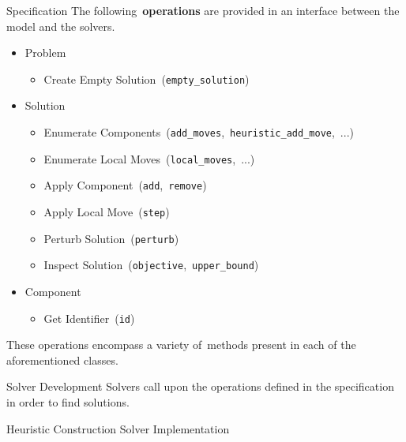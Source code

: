 \begin{frame}{Specification}
  The following~\textbf{operations} are provided in an interface between the model and the solvers.

  \begin{itemize}
    \item Problem
          \begin{itemize}
            \item Create Empty Solution~(\texttt{empty\_solution})
          \end{itemize}
    \item Solution
          \begin{itemize}
            \item Enumerate Components~(\texttt{add\_moves},~\texttt{heuristic\_add\_move},~...)
            \item Enumerate Local Moves~(\texttt{local\_moves},~...)
            \item Apply Component~(\texttt{add},~\texttt{remove})
            \item Apply Local Move~(\texttt{step})
            \item Perturb Solution~(\texttt{perturb})
            \item Inspect Solution~(\texttt{objective},~\texttt{upper\_bound})
          \end{itemize}
    \item Component
          \begin{itemize}
            \item Get Identifier~(\texttt{id})
          \end{itemize}
  \end{itemize}

  These operations encompass a variety of~\alert{methods} present in each of the aforementioned classes.
\end{frame}

\begin{frame}[fragile]{Solver Development}
  Solvers call upon the operations defined in the specification in order to find solutions.

  \begin{block}{Heuristic Construction Solver Implementation}
    \begin{center}
      \scalebox{0.95}{
        
      }
    \end{center}
  \end{block}

\end{frame}